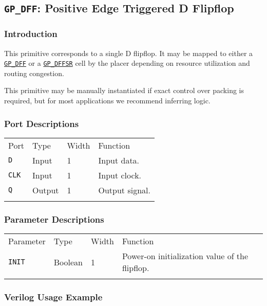 \documentclass[11pt]{article}
\newcommand{\tokenstyle}[1]{\texttt{#1}}
\newcommand{\whenstyle}[1]{{\fontseries{sb}\selectfont#1}}
\newcommand{\tokenref}[2]{\hyperref[#2]{\tokenstyle{#1}}}
\newcommand{\thinhline}{\Xhline{1\arrayrulewidth}}
\newcommand{\thickhline}{\Xhline{2.5\arrayrulewidth}}
\begin{document}
\pagebreak
\subsection{\tokenstyle{GP\_DFF}: Positive Edge Triggered D Flipflop}
\label{gp-dff}

\subsubsection{Introduction}
This primitive corresponds to a single D flipflop. It may be mapped to either a \tokenref{GP\_DFF}{gp-dff} or a
\tokenref{GP\_DFFSR}{gp-dffsr} cell by the placer depending on resource utilization and routing congestion.

This primitive may be manually instantiated if exact control over packing is required, but for most applications we
recommend inferring logic.

\subsubsection{Port Descriptions}

\begin{tabularx}{\textwidth}{lllX}
\thinhline
\whenstyle{Port} & \whenstyle{Type} & \whenstyle{Width} & \whenstyle{Function} \\
\thickhline
\tokenstyle{D} & Input & 1 & Input data. \\
\thinhline
\tokenstyle{CLK} & Input & 1 & Input clock. \\
\thinhline
\tokenstyle{Q} & Output & 1 & Output signal. \\
\thinhline
\end{tabularx}

\subsubsection{Parameter Descriptions}

\begin{tabularx}{\textwidth}{lllX}
\thinhline
\whenstyle{Parameter} & \whenstyle{Type} & \whenstyle{Width} & \whenstyle{Function} \\
\thickhline
\tokenstyle{INIT} & Boolean & 1 & Power-on initialization value of the flipflop. \\
\thinhline
\end{tabularx}

\subsubsection{Verilog Usage Example}
\end{document}
